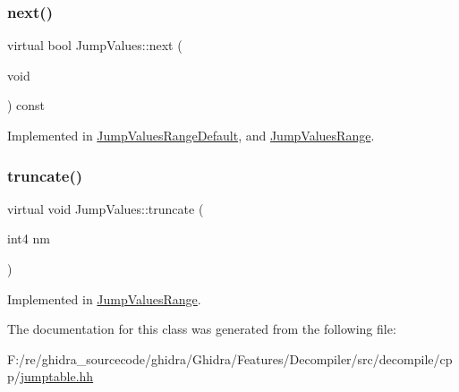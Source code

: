 \subsubsection{\texorpdfstring{next()}{next()}}
{\footnotesize\ttfamily virtual bool Jump\+Values\+::next (\begin{DoxyParamCaption}\item[{void}]{ }\end{DoxyParamCaption}) const\hspace{0.3cm}{\ttfamily [pure virtual]}}



Implemented in \mbox{\hyperlink{class_jump_values_range_default_a1edd06eae7c959fc1b48865fe1bf342d}{Jump\+Values\+Range\+Default}}, and \mbox{\hyperlink{class_jump_values_range_a1738552386fc802eaf6326a439c66bba}{Jump\+Values\+Range}}.

\mbox{\label{class_jump_values_a8a7cbd3dad9ae70992f122c5da0b43ea}} 
\subsubsection{\texorpdfstring{truncate()}{truncate()}}
{\footnotesize\ttfamily virtual void Jump\+Values\+::truncate (\begin{DoxyParamCaption}\item[{int4}]{nm }\end{DoxyParamCaption})\hspace{0.3cm}{\ttfamily [pure virtual]}}



Implemented in \mbox{\hyperlink{class_jump_values_range_a7db1100f69820afdec9f6bfef09db8b1}{Jump\+Values\+Range}}.



The documentation for this class was generated from the following file\+:\begin{DoxyCompactItemize}
\item 
F\+:/re/ghidra\+\_\+sourcecode/ghidra/\+Ghidra/\+Features/\+Decompiler/src/decompile/cpp/\mbox{\hyperlink{jumptable_8hh}{jumptable.\+hh}}\end{DoxyCompactItemize}
